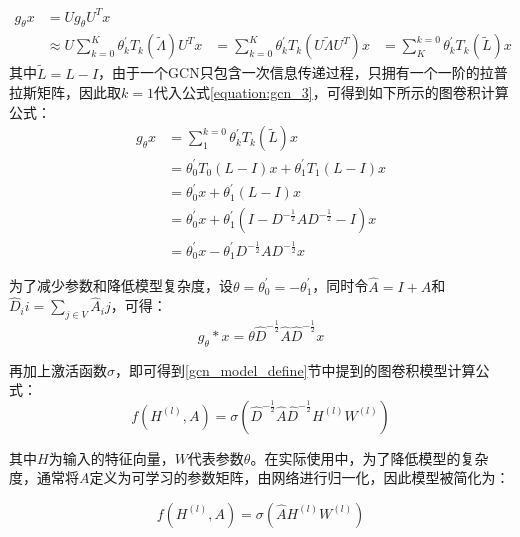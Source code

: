 \begin{equation}
    \begin{aligned}
        g_\theta x &= Ug_\theta U^T x \\
        &\approx U \sum_{k=0}^{K} \theta^{\prime}_k T_k (\widetilde{\Lambda}) U^Tx
        &=\sum_{k=0}^{K} \theta^{\prime}_k T_k (U\widetilde{\Lambda}U^T)x
        &=\sum_{K}^{k=0} \theta^{\prime}_k T_k(\widetilde{L})x
    \end{aligned}
    \label{equation:gcn_3}
\end{equation}
其中$\widetilde{L} = L - I$，由于一个GCN只包含一次信息传递过程，只拥有一个一阶的拉普拉斯矩阵，因此取$k=1$代入公式\ref{equation:gcn_3}，可得到如下所示的图卷积计算公式：
\begin{equation}
    \begin{aligned}
        g_\theta x &=\sum_{1}^{k=0} \theta^{\prime}_k T_k(\widetilde{L})x \\
        &=\theta^{\prime}_0 T_0(L-I)x + \theta^{\prime}_1 T_1(L-I)x \\ 
        &=\theta^{\prime}_0x + \theta^{\prime}_1(L-I)x\\
        &=\theta^{\prime}_0x + \theta^{\prime}_1(I-D^{-\frac{1}{2}}AD^{-\frac{1}{2}}-I)x\\
        &=\theta^{\prime}_0x - \theta^{\prime}_1 D^{-\frac{1}{2}}AD^{-\frac{1}{2}} x
    \end{aligned}
    \label{equation:gcn_4}
\end{equation}

为了减少参数和降低模型复杂度，设$\theta = \theta^{\prime}_0 = -\theta^{\prime}_1$，同时令$\hat{A} = I+A$和$\hat{D}_ii = \sum_{j \in V}\hat{A}_ij$，可得：
\begin{equation}
        g_\theta * x =\theta \hat{D}^{-\frac{1}{2}}\hat{A} \hat{D}^{-\frac{1}{2}} x
    \label{equation:gcn_5}
\end{equation}

再加上激活函数$\sigma$，即可得到\ref{gcn_model_define}节中提到的图卷积模型计算公式：
\begin{equation}
    f(H^{(l)},A) = \sigma\left( \hat{D}^{-\frac{1}{2}} \hat{A} \hat{D}^{-\frac{1}{2}} H^{(l)}W^{(l)} \right)
    \label{equation:GCN_define_2}
 \end{equation}

其中$H$为输入的特征向量，$W$代表参数$\theta$。在实际使用中，为了降低模型的复杂度，通常将$A$定义为可学习的参数矩阵，由网络进行归一化，因此模型被简化为：

\begin{equation}
    f(H^{(l)},A) = \sigma\left(\hat{A}H^{(l)}W^{(l)} \right)
\end{equation}


